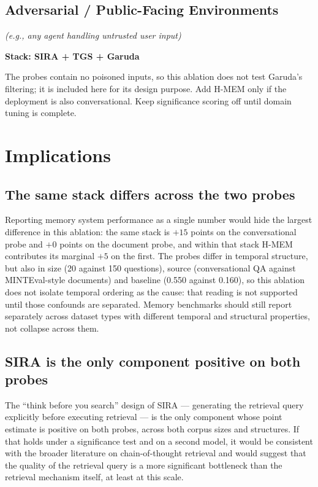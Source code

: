 \documentclass[11pt,a4paper]{article}
\begin{document}
\subsection{Adversarial / Public-Facing Environments}
\textit{(e.g., any agent handling untrusted user input)}

\textbf{Stack: SIRA + TGS + Garuda}

The probes contain no poisoned inputs, so this ablation does not test Garuda's filtering; it is included here for its design purpose. Add H-MEM only if the deployment is also conversational. Keep significance scoring off until domain tuning is complete.

\section{Implications}

\subsection{The same stack differs across the two probes}

Reporting memory system performance as a single number would hide the largest difference in this ablation: the same stack is $+15$ points on the conversational probe and $+0$ points on the document probe, and within that stack H-MEM contributes its marginal $+5$ on the first. The probes differ in temporal structure, but also in size (20 against 150 questions), source (conversational QA against MINTEval-style documents) and baseline (0.550 against 0.160), so this ablation does not isolate temporal ordering as the cause: that reading is not supported until those confounds are separated. Memory benchmarks should still report separately across dataset types with different temporal and structural properties, not collapse across them.

\subsection{SIRA is the only component positive on both probes}

The ``think before you search'' design of SIRA --- generating the retrieval query explicitly before executing retrieval --- is the only component whose point estimate is positive on both probes, across both corpus sizes and structures. If that holds under a significance test and on a second model, it would be consistent with the broader literature on chain-of-thought retrieval and would suggest that the quality of the retrieval query is a more significant bottleneck than the retrieval mechanism itself, at least at this scale.
\end{document}
